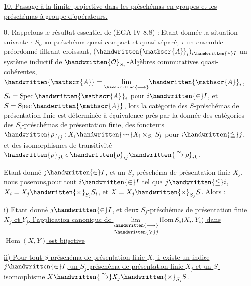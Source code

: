 
\uline{10. Passage à la limite projective dans les préschémas en groupes et les préschémas à groupe d'opérateurs.}

0. Rappelons le résultat essentiel de (EGA IV 8.8) : Etant donnée la situation suivante : $S_o$ un préschéma quasi-compact et quasi-séparé, $I$ un ensemble préordonné filtrant croissant, $(\handwritten{\mathscr{A}}_i)_{i\handwritten{\in}I}$ un système inductif de $\handwritten{\mathcal{O}}_{S_o}$-Algèbres commutatives quasi-cohérentes, $\handwritten{\mathscr{A}}=\underset{\handwritten{\longrightarrow}}{\lim}\handwritten{\mathscr{A}}_i$, $S_i=\operatorname{Spec}\handwritten{\mathscr{A}}_i$ pour $i\handwritten{\in}I$, et $S=\operatorname{Spec}\handwritten{\mathscr{A}}$, lors la catégorie des $S$-préschémas de présentation finie est déterminée à équivalence près par la donnée des catégories des $S_i$-préschémas de présentation finie, des foncteurs  $\handwritten{\rho}_{ij}:X_i\handwritten{\rightsquigarrow}X_i\times_{S_i}S_j$ \deleted{\unsure{,|;}} pour $i\handwritten{\leqq}j$, et des isomorphismes de transitivité $\handwritten{\rho}_{jk}\mathbin{o}\handwritten{\rho}_{ij}\handwritten{\xrightarrow{\sim}\rho}_{ik}$.  

Etant donné $j\handwritten{\in}I$, et un $S_j$-préschéma de présentation finie $X_j$, nous poserons,pour tout $i\handwritten{\in}I$ tel que $j\handwritten{\leqq}i$, $X_i=X_j\handwritten{\times}_{S_j}S_i$, et $X=X_j\handwritten{\times}_{S_j}S$. Alors :\handwritten{\unsure{;|:}}\margin{\handwritten{(}}

\uline{i) Etant donné $j\handwritten{\in}I$, et deux $S_j$-préschémas de présentation finie $X_j$ et $Y_j$, l'application canonique de $\underset{i\handwritten{\geqslant}j}{\underset{\handwritten{\longrightarrow}}{\lim}}\operatorname{Hom} S_i(X_i,Y_i)$ dans $\operatorname{Hom}(X,Y)$ est bijective}\margin{\handwritten{(}}

\uline{ii) Pour tout $S$-préschéma de présentation finie $X$, il existe un indice $j\handwritten{\in}I$,  un $S_j$-préschéma de présentation finie $X_j$ et un $S$-isomorphisme $X\handwritten{\xrightarrow{\sim}}X_j\handwritten{\times}_{S_j}S$.}

